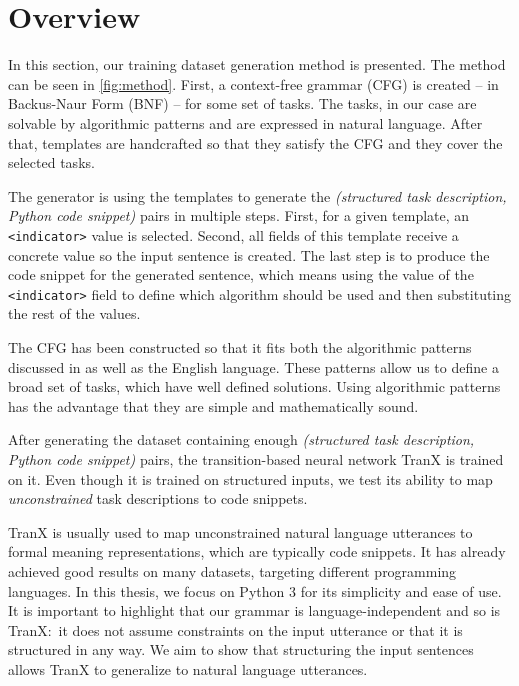 \section{Overview}


In this section, our training dataset generation method is presented. The method can be seen in \cref{fig:method}. First, a context-free grammar (CFG) is created -- in Backus-Naur Form (BNF)\cite{bnf} -- for some set of tasks. The tasks, in our case are solvable by algorithmic patterns and are expressed in natural language. After that, templates are handcrafted so that they satisfy the CFG and they cover the selected tasks.

The generator is using the templates to generate the \emph{(structured task
description, Python code snippet)} pairs in multiple steps. First, for a given
template, an \verb|<indicator>| value is selected. Second, all fields of this
template receive a concrete value so the input sentence is created. The last
step is to produce the code snippet for the generated sentence, which means
using the value of the \verb|<indicator>| field to define which algorithm should
be used and then substituting the rest of the values.

The CFG has been constructed so that it fits both the algorithmic patterns
discussed in \cite{progT} as well as the English language. These patterns allow
us to define a broad set of tasks, which have well defined solutions. Using
algorithmic patterns has the advantage that they are simple and mathematically
sound.

After generating the dataset containing enough \emph{(structured task description, Python code snippet)} pairs, the transition-based neural network TranX \cite{tranx} is trained on it.
Even though it is trained on structured inputs, we test its ability to map \emph{unconstrained} task descriptions to code snippets.

TranX is usually used to map unconstrained natural language utterances to formal
meaning representations, which are typically code snippets. It has already
achieved good results on many datasets, targeting different programming
languages. In this thesis, we focus on Python 3 for its simplicity and ease of
use. It is important to highlight that our grammar is language-independent and
so is TranX:~it does not assume constraints on the input utterance or that it is
structured in any way. We aim to show that structuring the input sentences
allows TranX to generalize to natural language utterances.

